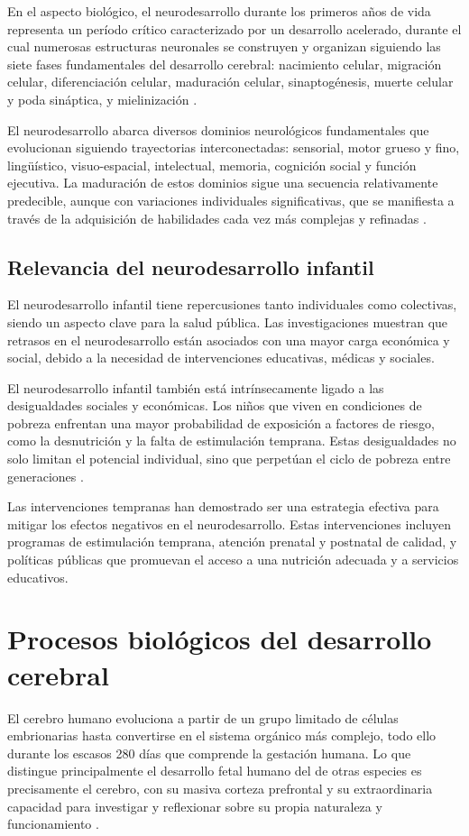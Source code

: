 En el aspecto biológico, el neurodesarrollo durante los primeros años de vida
representa un período crítico caracterizado por un desarrollo acelerado, 
durante el cual numerosas estructuras neuronales se construyen y organizan 
siguiendo las siete fases fundamentales del desarrollo cerebral: nacimiento 
celular, migración celular, diferenciación celular, maduración celular, 
sinaptogénesis, muerte celular y poda sináptica, y mielinización \cite{Kolb7}.

El neurodesarrollo abarca diversos dominios neurológicos fundamentales que 
evolucionan siguiendo trayectorias interconectadas: sensorial, motor grueso y
fino, lingüístico, visuo-espacial, intelectual, memoria, cognición social y
función ejecutiva. La maduración de estos dominios sigue una secuencia
relativamente predecible, aunque con  variaciones individuales significativas,
que se manifiesta a través de la  adquisición de habilidades cada vez más
complejas y refinadas \cite{Nelson49}.

\subsection{Relevancia del neurodesarrollo infantil}
El neurodesarrollo infantil tiene repercusiones tanto individuales como
colectivas, siendo un aspecto clave para la salud pública. Las investigaciones
muestran que retrasos en el neurodesarrollo están asociados con una mayor carga
económica y social, debido a la necesidad de intervenciones educativas, médicas
y sociales.

El neurodesarrollo infantil también está intrínsecamente ligado a las 
desigualdades sociales y económicas. Los niños que viven en condiciones de 
pobreza enfrentan una mayor probabilidad de exposición a factores de riesgo, 
como la desnutrición y la falta de estimulación temprana. Estas desigualdades 
no solo limitan el potencial individual, sino que perpetúan el ciclo de pobreza 
entre generaciones \cite{UNICEF2023}.

Las intervenciones tempranas han demostrado ser una estrategia efectiva para 
mitigar los efectos negativos en el neurodesarrollo. Estas intervenciones
incluyen programas de estimulación temprana, atención prenatal y postnatal de
calidad, y políticas públicas que promuevan el acceso a una nutrición adecuada
y a servicios educativos.

\section{Procesos biológicos del desarrollo cerebral}
El cerebro humano evoluciona a partir de un grupo limitado de células
embrionarias hasta convertirse en el sistema orgánico más complejo, todo ello
durante los escasos 280 días que comprende la gestación humana. Lo que 
distingue principalmente el desarrollo fetal humano del de otras especies es 
precisamente el cerebro, con su masiva corteza prefrontal y su extraordinaria 
capacidad para investigar y reflexionar sobre su propia naturaleza y 
funcionamiento \cite{Polin124}.


